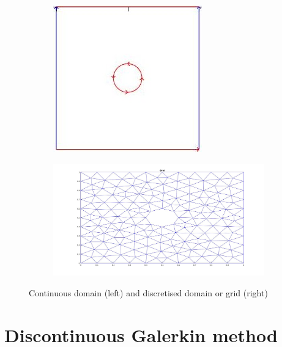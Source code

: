 \documentclass[a4paper,openany]{book}
\begin{document}
\begin{figure}[H]
\begin{subfigure}{.5\textwidth}
\centering
  \includegraphics[width=\linewidth]{domain.jpg}
  \label{fig:Domain}
\end{subfigure}
\begin{subfigure}{.5\textwidth}	
\centering
  \includegraphics[width=\linewidth]{grid.jpg}
  \label{fig:Mesh}
\end{subfigure}
\caption{Continuous domain (left) and discretised domain or grid (right)}
\label{fig:continuous_grid_figure}
\end{figure}

\section{Discontinuous Galerkin method}
\end{document}
